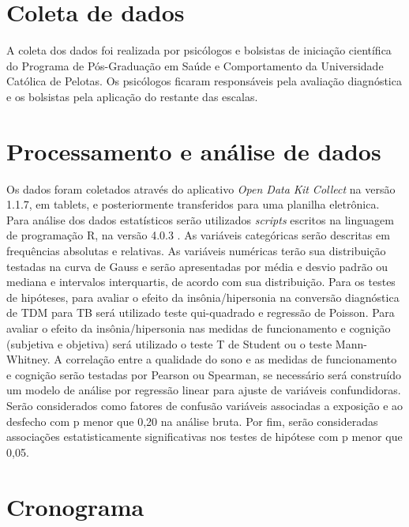 \documentclass[chapter=TITLE,
               oneside,
               12pt,
               a4paper,
               english,
               brazil]{abntex2}    %
\begin{document}
\section{Coleta de dados}\label{sec:coleta}

    A coleta dos dados foi realizada por psicólogos e bolsistas de iniciação
    científica do Programa de Pós-Graduação em Saúde e Comportamento da
    Universidade Católica de Pelotas.
    Os psicólogos ficaram responsáveis pela avaliação
    diagnóstica e os bolsistas pela aplicação do restante das escalas.

\section{Processamento e análise de dados}\label{sec:analise}

    Os dados foram coletados através do aplicativo \textit{Open Data Kit Collect}
    na versão 1.1.7, em tablets, e posteriormente transferidos para uma planilha
    eletrônica. Para análise dos dados estatísticos serão utilizados
    \textit{scripts} escritos na linguagem de programação R, na versão 4.0.3
    \parencite{r_language}.
    As variáveis categóricas serão descritas em frequências absolutas e relativas.
    As variáveis numéricas terão sua distribuição testadas na curva de Gauss e serão
    apresentadas por média e desvio padrão ou mediana e intervalos interquartis,
    de acordo com sua distribuição.
    Para os testes de hipóteses, para avaliar o efeito da insônia/hipersonia na
    conversão diagnóstica de TDM para TB será utilizado teste qui-quadrado e
    regressão de Poisson. Para avaliar o efeito da insônia/hipersonia nas medidas
    de funcionamento e cognição (subjetiva e objetiva) será utilizado o teste T
    de Student ou o teste Mann-Whitney.
    A correlação entre a qualidade do sono e as medidas de funcionamento e cognição
    serão testadas por Pearson ou Spearman, se necessário será construído um modelo
    de análise por regressão linear para ajuste de variáveis confundidoras.
    Serão considerados como fatores de confusão variáveis associadas a exposição
    e ao desfecho com p menor que 0,20 na análise bruta. Por fim, serão consideradas
    associações estatisticamente significativas nos testes de hipótese com p
    menor que 0,05.

\section{Cronograma}\label{sec:cronograma}
\end{document}
